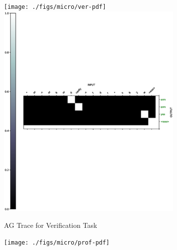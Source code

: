 \begin{figure}[ht] 
	\begin{subfigure}[b]{0.5\linewidth}
		\centering
		\ifpdf
		\texttt{[image: ./figs/micro/ver-pdf]}
		\else
		\includegraphics[width=0.95\linewidth]{./figs/micro/ver-eps}
		\fi
		\caption{AG Trace for Verification Task} 
		\label{ag_ver} 
		\vspace{2ex}
	\end{subfigure}%
	\begin{subfigure}[b]{0.5\linewidth}
		\centering
		\ifpdf
		\texttt{[image: ./figs/micro/prof-pdf]}
		\else

\end{subfigure}
\end{figure}
